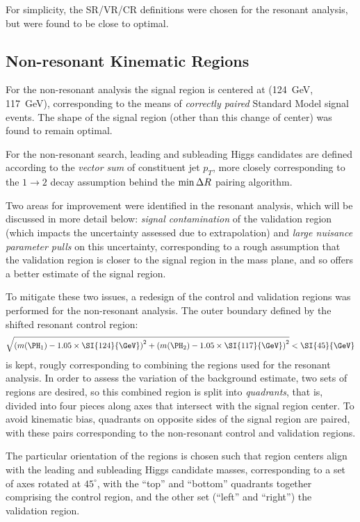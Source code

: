 For simplicity, the  SR/VR/CR definitions were chosen for the resonant analysis, 
but were found to be close to optimal.

\subsection{Non-resonant Kinematic Regions}
For the non-resonant analysis the signal region is centered at (\SI{124}{\GeV}, \SI{117}{\GeV}),
corresponding to the means of \emph{correctly paired} Standard Model signal events. The shape of 
the signal region (other than this change of center) was found to remain optimal.

For the non-resonant search, leading and subleading Higgs candidates are defined according to the 
\emph{vector sum} of constituent jet $p_{T}$, more closely corresponding to the $1\rightarrow 2$ decay assumption
behind the $\min{\ensuremath{\Delta R}}$ pairing algorithm. 

Two areas for improvement were identified in the resonant analysis, which will be discussed in more detail below: 
\emph{signal contamination} of the validation region (which impacts the uncertainty assessed due to extrapolation)
and \emph{large nuisance parameter pulls} on this uncertainty, corresponding to a rough assumption that the 
validation region is closer to the signal region in the mass plane, and so offers a better estimate of the 
signal region.

To mitigate these two issues, a redesign of the control and validation regions was performed for 
the non-resonant analysis. The outer boundary defined by the shifted resonant control region:
\begin{equation}
	\label{eqn:ctrl-reg-def}
	\sqrt{\qty(\mh1 - 1.05 \times \SI{124}{\GeV})^{2} + \qty(\mh2 - 1.05 \times
		\SI{117}{\GeV})^{2}} < \SI{45}{\GeV}
\end{equation}
is kept, rougly corresponding to combining the regions used for the resonant analysis. In order 
to assess the variation of the background estimate, two sets of regions are desired, so this combined 
region is split into \emph{quadrants}, that is, divided into four pieces along axes that intersect 
with the signal region center. To avoid kinematic bias, quadrants on opposite sides of the signal 
region are paired, with these pairs corresponding to the non-resonant control and validation regions.

The particular orientation of the regions is chosen such that region centers align with the leading
and subleading Higgs candidate masses, corresponding to a set of axes rotated at $45^{\circ}$, with the ``top''
and ``bottom'' quadrants together comprising the control region, and the other set (``left'' and ``right'')
the validation region.

